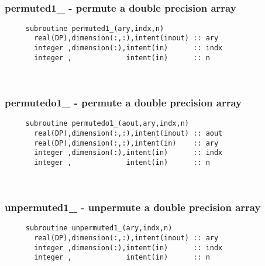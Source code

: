  
\mbox{}\hrulefill\ 
 

  \subsubsection{permuted1\_ - permute a double precision array}

\begin{verbatim} 
     subroutine permuted1_(ary,indx,n)
       real(DP),dimension(:,:),intent(inout) :: ary
       integer ,dimension(:),intent(in)      :: indx
       integer ,             intent(in)      :: n
 \end{verbatim}%
 
 
\mbox{}\hrulefill\ 
 

  \subsubsection{permutedo1\_ - permute a double precision array}

\begin{verbatim} 
     subroutine permutedo1_(aout,ary,indx,n)
       real(DP),dimension(:,:),intent(inout) :: aout
       real(DP),dimension(:,:),intent(in)    :: ary
       integer ,dimension(:),intent(in)      :: indx
       integer ,             intent(in)      :: n
 \end{verbatim}%
 
 
\mbox{}\hrulefill\ 
 

  \subsubsection{unpermuted1\_ - unpermute a double precision array}

\begin{verbatim} 
     subroutine unpermuted1_(ary,indx,n)
       real(DP),dimension(:,:),intent(inout) :: ary
       integer ,dimension(:),intent(in)      :: indx
       integer ,             intent(in)      :: n
 \end{verbatim}%
 

